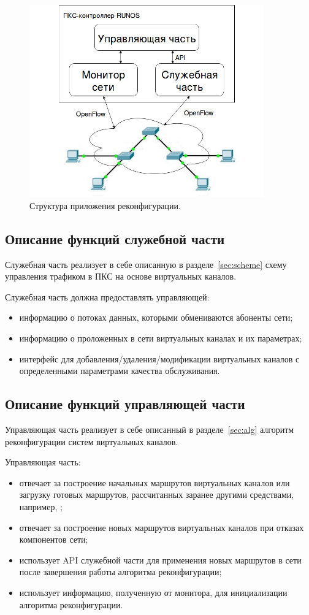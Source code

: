 \documentclass[12pt, a4paper]{article}
\begin{document}
\begin{figure}[h!]
	\centering
	\includegraphics[width=0.90\textwidth]{img/netcontrol.png}
	\caption{Структура приложения реконфигурации.}
	\label{pic:netcontrol}
\end{figure}

\FloatBarrier
\subsection{Описание функций служебной части}
Служебная часть реализует в себе описанную в разделе~\ref{sec:scheme} схему управления трафиком в ПКС на основе виртуальных каналов.
 
Служебная часть должна предоставлять управляющей:
\begin{itemize}
	\item информацию о потоках данных, которыми обмениваются абоненты сети;
	\item информацию о проложенных в сети виртуальных каналах и их параметрах;
	\item интерфейс для добавления/удаления/модификации виртуальных каналов с определенными параметрами качества обслуживания.
\end{itemize}

\subsection{Описание функций управляющей части}
Управляющая часть реализует в себе описанный в разделе~\ref{sec:alg} алгоритм реконфигурации систем виртуальных каналов.

Управляющая часть:
\begin{itemize}
	\item отвечает за построение начальных маршрутов виртуальных каналов или загрузку готовых маршрутов, рассчитанных заранее другими средствами, например, \cite{vdovin};
	\item отвечает за построение новых маршрутов виртуальных каналов при отказах компонентов сети;
	\item использует API служебной части для применения новых маршрутов в сети после завершения работы алгоритма реконфигурации;
	\item использует информацию, полученную от монитора, для инициализации алгоритма реконфигурации.
\end{itemize}
\end{document}

